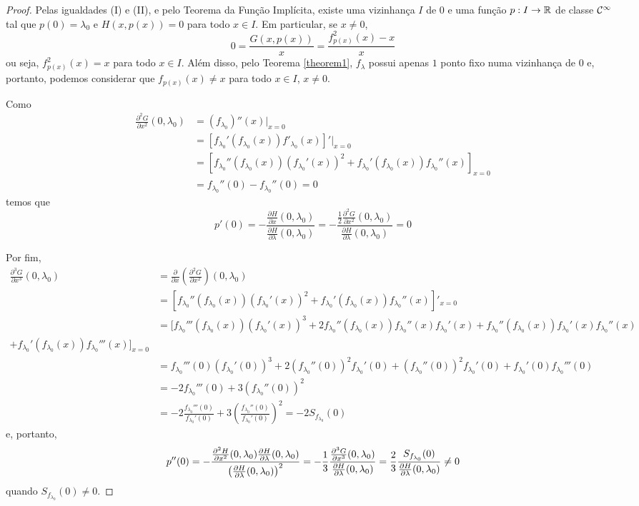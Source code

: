 \begin{proof}
Pelas igualdades (I) e (II), e pelo Teorema da Função Implícita, existe uma vizinhança $I$ de $0$ e uma função $p: I \to \mathbb{R}$ de classe $\mathcal{C}^\infty$ tal que $p(0) = \lambda_0$ e $H(x, p(x)) = 0$ para todo $x \in I$. Em particular, se $x \neq 0$,
$$0 = \frac{G(x, p(x))}{x} = \frac{f^2_{p(x)}(x) - x}{x}$$
ou seja, $f^2_{p(x)}(x) = x$ para todo $x \in I$. Além disso, pelo Teorema \ref{theorem1}, $f_\lambda$ possui apenas $1$ ponto fixo numa vizinhança de $0$ e, portanto, podemos considerar que $f_{p(x)}(x) \neq x$ para todo $x \in I$, $x \neq 0$.

Como
\begin{align*}
\frac{\partial^2 G}{\partial x^2}(0, \lambda_0) & = (f_{\lambda_0})''(x)|_{x = 0} \\
& = [f_{\lambda_0}'(f_{\lambda_0}(x)) f'_{\lambda_0}(x)]'|_{x = 0} \\
& = [f_{\lambda_0}''(f_{\lambda_0}(x))(f_{\lambda_0}'(x))^2 + f_{\lambda_0}'(f_{\lambda_0}(x))f_{\lambda_0}''(x)]_{x = 0} \\
& = f_{\lambda_0}''(0) - f_{\lambda_0}''(0) = 0
\end{align*} temos que
$$p'(0) = -\frac{\frac{\partial H}{\partial x}(0, \lambda_0) }{\frac{\partial H }{\partial \lambda}(0, \lambda_0)} = -\frac{\frac{1}{2} \frac{\partial^2 G}{\partial x^2}(0, \lambda_0) }{\frac{\partial H }{\partial \lambda}(0, \lambda_0)} = 0$$

Por fim,
\begin{align*}
\frac{\partial^3 G}{\partial x^3}(0, \lambda_0) & = \frac{\partial}{\partial x} \left(\frac{\partial^2 G}{\partial x^2}\right)(0, \lambda_0) \\
& = [f_{\lambda_0}''(f_{\lambda_0}(x))(f_{\lambda_0}'(x))^2
+ f_{\lambda_0}'(f_{\lambda_0}(x))f_{\lambda_0}''(x)]'_{x = 0} \\
& = [f_{\lambda_0}'''(f_{\lambda_0}(x))(f_{\lambda_0}'(x))^3
+ 2f_{\lambda_0}''(f_{\lambda_0}(x))f_{\lambda_0}''(x)f_{\lambda_0}'(x)
+ f_{\lambda_0}''(f_{\lambda_0}(x)) f_{\lambda_0}'(x)f_{\lambda_0}''(x) \\
+ f_{\lambda_0}'(f_{\lambda_0}(x))f_{\lambda_0}'''(x)]_{x = 0} \\
& = f_{\lambda_0}'''(0)(f_{\lambda_0}'(0))^3  + 2(f_{\lambda_0}''(0))^2f_{\lambda_0}'(0) + (f_{\lambda_0}''(0))^2f_{\lambda_0}'(0) + f_{\lambda_0}'(0)f_{\lambda_0}'''(0) \\
& = - 2f_{\lambda_0}'''(0) + 3(f_{\lambda_0}''(0))^2 \\
& = - 2\frac{f_{\lambda_0}'''(0)}{f_{\lambda_0}'(0)} +3\left( \frac{f_{\lambda_0}''(0)}{f_{\lambda_0}'(0)} \right)^2 = -2 S_{f_{\lambda_0}}(0)
\end{align*}
e, portanto,
$$ p''(0) = - \frac{\frac{\partial^2 H}{\partial x^2}(0, \lambda_0)\frac{\partial H}{\partial \lambda}(0, \lambda_0)}{ \left( \frac{ \partial H}{\partial \lambda}(0, \lambda_0) \right)^2} \\
= -\frac{1}{3} \frac{\frac{\partial^3 G}{\partial x^3}(0, \lambda_0)}{\frac{\partial H}{\partial \lambda}(0, \lambda_0)} = \frac{2}{3} \frac{S_{f_{\lambda_0}}(0)}{\frac{\partial H}{\partial \lambda}(0, \lambda_0)} \neq 0$$
quando $S_{f_{\lambda_0}}(0) \neq 0$.
\end{proof}